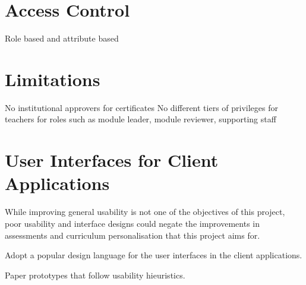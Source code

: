 \section{Access Control}
Role based and attribute based

\section{Limitations}
No institutional approvers for certificates
No different tiers of privileges for teachers for roles such as module leader, module reviewer, supporting staff

\section{User Interfaces for Client Applications}

While improving general usability is not one of the objectives of this project, poor usability and interface designs 
could negate the improvements in assessments and curriculum personalisation that this project aims for.

Adopt a popular design language for the user interfaces in the client applications.

Paper prototypes that follow usability hieuristics.